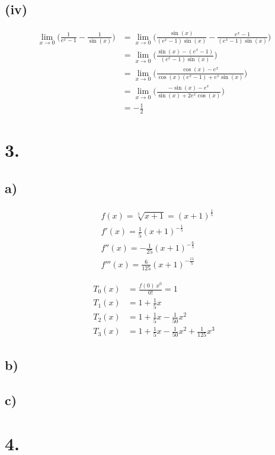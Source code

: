 \documentclass[a4paper]{scrartcl}
\begin{document}
\subsection{(iv)}
\begin{align}
\lim\limits_{x\to 0}\bigg(\frac{1}{e^x-1}-\frac{1}{\sin(x)}\bigg)&=\lim\limits_{x\to 0}\bigg(\frac{\sin(x)}{(e^x-1)\sin(x)}-\frac{e^x-1}{(e^x-1)\sin(x)}\bigg)\\
	&=\lim\limits_{x\to 0}\bigg(\frac{\sin(x)-(e^x-1)}{(e^x-1)\sin(x)}\bigg)\\
	&=\lim\limits_{x\to 0}\bigg(\frac{\cos(x)-e^x}{\cos(x)(e^x-1)+e^x\sin(x)}\bigg)\\
	&=\lim\limits_{x\to 0}\bigg(\frac{-\sin(x)-e^x}{\sin(x)+2e^x\cos(x)}\bigg)\\
	&=-\frac{1}{2}
\end{align}
\section{3.}
\subsection{a)}
\begin{align}
&f(x) = \sqrt[5]{x+1} = (x+1)^{\frac 1 5} \\
&f'(x) = \frac 1 5 (x+1)^{-\frac 1 5} \\
&f''(x) = -\frac 1 {25} (x+1)^{-\frac 6 5} \\
&f'''(x) = \frac 6 {125} (x+1)^{-\frac {11} 5}
\end{align}

\begin{align}
T_0(x)& = \frac{f(0)\ x^0}{0!} = 1 \\
T_1(x)& = 1 + \frac 1 5 x \\
T_2(x)& = 1 + \frac 1 5 x - \frac 1 {50} x^2 \\
T_3(x)& = 1 + \frac 1 5 x - \frac 1 {50} x^2 + \frac 1 {125} x^3
\end{align}

\subsection{b)}
\subsection{c)}
\newpage
\section{4.}
\end{document}
